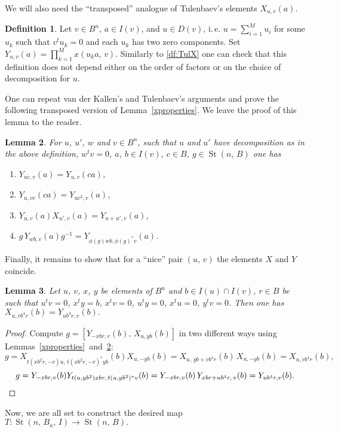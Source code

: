 \documentclass[11pt]{amsart}
\theoremstyle{plain} \declaretheorem[name=Theorem, Refname={Theorem,Theorems}]{tm} \Crefname{tm}{Theorem}{Theorems}
\numberwithin{equation}{section}
\newtheorem{lm}{Lemma} \numberwithin{lm}{section} \Crefname{lm}{Lemma}{Lemmas}
\theoremstyle{definition} \newtheorem{df}[lm]{Definition} \Crefname{df}{Definition}{Definitions}
\theoremstyle{remark} \newtheorem{rk}[lm]{Remark} \Crefname{rk}{Remark}{Remarks}
\newcommand{\St}{\mathop{\mathrm{St}}\nolimits}
\newcommand{\inv}{^{-1}}
\begin{document}
We will also need the ``transposed'' analogue of Tulenbaev's elements $X_{u,v}(a)$.
\begin{df} \label{df:TulY}
Let $v\in B^n$, $a\in I(v)$, and $u \in D(v)$, i.\,e. $u = \sum\limits_{i=1}^M u_i$ for some $u_k$ such that $v^tu_k=0$ and each $u_k$ has two zero components.
Set $Y_{u,v}(a)=\prod_{k=1}^Mx(u_ka,\,v)$. 
Similarly to \ref{df:TulX} one can check that this definition does not depend either on the order of factors or on the choice of decomposition for $u$.
\end{df}

One can repeat van der Kallen's and Tulenbaev's arguments and prove the following transposed version of Lemma~\ref{xproperties}.
We leave the proof of this lemma to the reader.
\begin{lm}
\label{yproperties}
For $u$, $u'$, $w$ and $v\in B^n$, such that $u$ and $u'$ have decomposition as in the above definition, $w^tv=0$, $a$, $b\in I(v)$, $c\in B$, $g\in\St(n,\,B)$ one has
\begin{enumerate}
\item $Y_{uc,v}(a)=Y_{u,v}(ca)$,
\item $Y_{u,vc}(ca)=Y_{uc^2,v}(a)$,
\item $Y_{u,v}(a)X_{u',v}(a)=Y_{u+u',v}(a)$,
\item $g\,Y_{wb,v}(a)g\inv=Y_{\phi(g)wb,\phi(g)^*v}(a)$.
\end{enumerate}
\end{lm}

Finally, it remains to show that for a ``nice'' pair $(u,\,v)$ the elements $X$ and $Y$ coincide.
\begin{lm}\label{x=y}
Let $u$, $v$, $x$, $y$ be elements of $B^n$ and $b\in I(u)\cap I(v)$, $r\in B$ be such that $u^t v = 0$, $x^ty=b$, $x^tv=0$, $u^ty=0$, $x^tu = 0$, $y^tv=0$.
Then one has $X_{u,vb^4r}(b)=Y_{ub^4r,v}(b).$
\end{lm}
\begin{proof}
Compute $g=[Y_{-xbr,v}(b),\,X_{u,yb}(b)]$ in two different ways using Lemmas~\ref{xproperties}~and~\ref{yproperties}:
$$ g = X_{t(xb^2r,-v)u,\,t(xb^2r,-v)^*yb}(b)X_{u,-yb}(b) = X_{u,\,yb+vb^4r}(b)\, X_{u,-yb}(b) = X_{u,vb^4r}(b),$$
$$ g = Y_{-xbr,v}(b) Y_{t(u,yb^2)xbr,\,t(u,yb^2)^*v}(b)= Y_{-xbr,v}(b)\, Y_{xbr+ub^4r,\,v}(b)=Y_{ub^4r,v}(b).\qedhere$$
\end{proof}

Now, we are all set to construct the desired map $T\colon\St(n,\,B_a,\,I)\rightarrow\St(n,\,B).$
\end{document}
